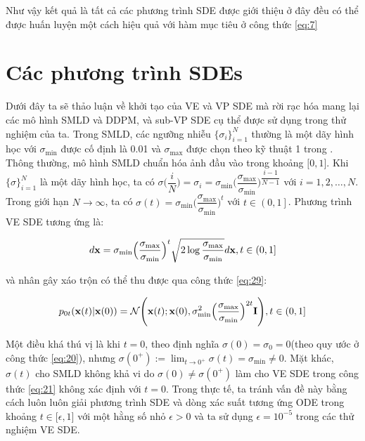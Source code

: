 \documentclass{article} %
\begin{document}
Như vậy kết quả là tất cả các phương trình SDE được giới thiệu ở đây đều có thể được huấn luyện một cách hiệu quả với hàm mục tiêu ở công thức \ref{eq:7}

\section{Các phương trình SDEs} \label{C}

Dưới đây ta sẽ thảo luận về khởi tạo của VE và VP SDE mà rời rạc hóa mang lại các mô hình SMLD và DDPM, và sub-VP SDE cụ thể được sử dụng trong thử nghiệm của ta.
Trong SMLD, các ngưỡng nhiễu $\lbrace \sigma_i \rbrace_{i=1}^N$ thường là một dãy hình học với $\sigma_{\min}$ được cố định là 0.01 và $\sigma_{\max}$ được chọn theo kỹ thuật 1 trong \citep{song2020improved}.
Thông thường, mô hình SMLD chuẩn hóa ảnh đầu vào trong khoảng $\lbrack 0, 1\rbrack$.
Khi $\lbrace \sigma \rbrace_{i=1}^N$ là một dãy hình học, ta có $\sigma\big( \dfrac{i}{N} \big)=\sigma_i=\sigma_{\min} \Big( \dfrac{\sigma_{\max}}{\sigma_{\min}} \Big)^{\dfrac{i-1}{N-1}}$ với $i=1, 2, \dots, N$.
Trong giới hạn $N \rightarrow \infty$, ta có $\sigma(t) = \sigma_{\min} \Big( \dfrac{\sigma_{\max}}{\sigma_{\min}} \Big)^t$ với $t \in \left ( 0, 1 \right ]$.
Phương trình VE SDE tương ứng là:

\begin{equation} \label{eq:30}
    d \bold{x} = \sigma_{\min} \Big( \dfrac{\sigma_{\max}}{\sigma_{\min}} \Big)^t \sqrt{2 \log \dfrac{\sigma_{\max}}{\sigma_{\min}}} d \bold{x}, t \in \left ( 0, 1 \right ]
\end{equation}

và nhân gây xáo trộn có thể thu được qua công thức \ref{eq:29}:

\begin{equation} \label{eq:31}
    p_{0t}(\bold{x} (t) \vert \bold{x}(0)) = \mathcal{N} \Bigg ( \bold{x}(t); \bold{x}(0), \sigma_{\min}^2 \Big( \dfrac{\sigma_{\max}}{\sigma_{\min}} \Big)^{2t} \bold{I} \Bigg), t \in \left ( 0, 1 \right ]
\end{equation}

Một điều khá thú vị là khi $t=0$, theo định nghĩa $\sigma(0) = \sigma_0 = 0$(theo quy ước ở công thức \ref{eq:20}), nhưng $\sigma(0^+):=\lim_{t \rightarrow 0^+}\sigma(t)= \sigma_{\min} \neq 0$.
Mặt khác, $\sigma(t)$ cho SMLD không khả vi do $\sigma(0) \neq \sigma(0^+)$ làm cho VE SDE trong công thức \ref{eq:21} không xác định với $t=0$.
Trong thực tế, ta tránh vấn đề này bằng cách luôn luôn giải phương trình SDE và dòng xác suất tương ứng ODE trong khoảng $t \in \lbrack \epsilon, 1 \rbrack$ với một hằng số nhỏ $\epsilon > 0$ và ta sử dụng $\epsilon = 10^{-5}$ trong các thử nghiệm VE SDE.
\end{document}
